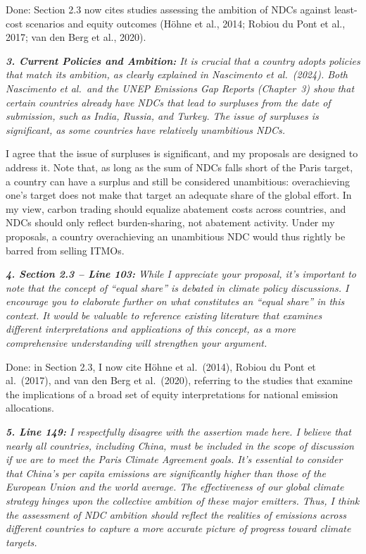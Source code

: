 \documentclass[11pt]{article}
\newenvironment{italic}{\itshape}{\par}
\begin{document}
Done: Section 2.3 now cites studies assessing the ambition of NDCs against least-cost scenarios and equity outcomes (H\"ohne et al., 2014; Robiou du Pont et al., 2017; van den Berg et al., 2020).


\begin{italic}
\textbf{3. Current Policies and Ambition:} It is crucial that a country adopts policies that match its ambition, as clearly explained in Nascimento et al.\ (2024). Both Nascimento et al.\ and the UNEP Emissions Gap Reports (Chapter~3) show that certain countries already have NDCs that lead to surpluses from the date of submission, such as India, Russia, and Turkey. The issue of surpluses is significant, as some countries have relatively unambitious NDCs.
\end{italic}

I agree that the issue of surpluses is significant, and my proposals are designed to address it. Note that, as long as the sum of NDCs falls short of the Paris target, a country can have a surplus and still be considered unambitious: overachieving one's target does not make that target an adequate share of the global effort. In my view, carbon trading should equalize abatement costs across countries, and NDCs should only reflect burden-sharing, not abatement activity. Under my proposals, a country overachieving an unambitious NDC would thus rightly be barred from selling ITMOs.



\begin{italic}
\textbf{4. Section 2.3 -- Line 103:} While I appreciate your proposal, it's important to note that the concept of ``equal share'' is debated in climate policy discussions. I encourage you to elaborate further on what constitutes an ``equal share'' in this context. It would be valuable to reference existing literature that examines different interpretations and applications of this concept, as a more comprehensive understanding will strengthen your argument.
\end{italic}

Done: in Section 2.3, I now cite H\"ohne et al.\ (2014), Robiou du Pont et al.\ (2017), and van den Berg et al.\ (2020), referring to the studies that examine the implications of a broad set of equity interpretations for national emission allocations.




\begin{italic}
\textbf{5. Line 149:} I respectfully disagree with the assertion made here. I believe that nearly all countries, including China, must be included in the scope of discussion if we are to meet the Paris Climate Agreement goals. It's essential to consider that China's per capita emissions are significantly higher than those of the European Union and the world average. The effectiveness of our global climate strategy hinges upon the collective ambition of these major emitters. Thus, I think the assessment of NDC ambition should reflect the realities of emissions across different countries to capture a more accurate picture of progress toward climate targets.
\end{italic}
\end{document}
